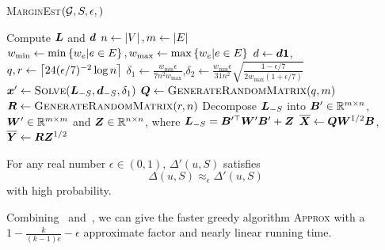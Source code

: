 \documentclass[sigconf]{acmart}
\begin{document}
\begin{algorithm}
    \caption{\textsc{MarginEst}\((\mathcal{G},S,\epsilon,)\)}
    \label{algo:marginest}
    Compute \(\boldsymbol{L}\) and \(\boldsymbol{d}\)\;
    \(n\gets\left|V \right|,m\gets\left|E \right|\)\;
    \(w_{\min}\gets\min\left\{w_e|e\in E \right\},w_{\max}\gets\max\left\{w_e|e\in E \right\}\)\;
    \(d\gets\boldsymbol{d}\boldsymbol{1}\),\(q,r\gets\left\lceil24(\epsilon/7)^{-2}\log n\right\rceil\)\;
    \(\delta_1\gets \frac{w_{\min}\epsilon}{7n^2w_{\max}}\),\(\delta_2\gets \frac{w_{\min}\epsilon}{31n^2}\sqrt{\frac{1-\epsilon/7}{2w_{\max}(1+\epsilon/7)}}\)\;
    \(\boldsymbol{x}'\gets\textsc{Solve}(\boldsymbol{L}_{-S},\boldsymbol{d}_{-S},\delta_1)\)\;
    \(\boldsymbol{Q}\gets\textsc{GenerateRandomMatrix}(q,m)\)\;
    \(\boldsymbol{R}\gets\textsc{GenerateRandomMatrix}(r,n)\)\;
    Decompose \(\boldsymbol{L}_{-S}\) into \(\boldsymbol{B}'\in\mathbb{R}^{m\times n}\), \(\boldsymbol{W}'\in\mathbb{R}^{m\times m}\) and \(\boldsymbol{Z}\in\mathbb{R}^{n\times n}\), where \(\boldsymbol{L}_{-S}=\boldsymbol{B}'^\top\boldsymbol{W}'\boldsymbol{B}'+\boldsymbol{Z}\)\;
    \(\overline{\boldsymbol{X}}\gets\boldsymbol{Q}\boldsymbol{W}^{1/2}\boldsymbol{B}\),\(\overline{\boldsymbol{Y}}\gets\boldsymbol{R}\boldsymbol{Z}^{1/2}\)\;

\end{algorithm}

\begin{theorem}\label{thm:approx-marginest}
    For any real number \(\epsilon\in(0,1)\), \(\Delta'(u,S)\) satisfies
    \[\Delta(u,S)\approx_\epsilon \Delta'(u,S)\]
    with high probability.
\end{theorem}


Combining~ and~, we can give the faster greedy algorithm \textsc{Approx} with a \(1-\frac{k}{(k-1)e}-\epsilon\) approximate factor and nearly linear running time.
\end{document}
